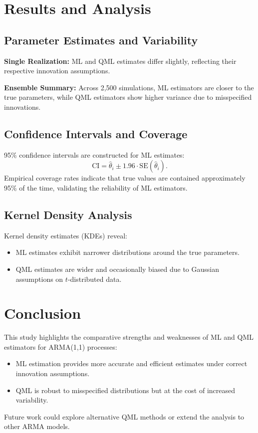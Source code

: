 \documentclass[a4paper,12pt]{article}
\begin{document}
\section{Results and Analysis}
\subsection{Parameter Estimates and Variability}
\textbf{Single Realization:} ML and QML estimates differ slightly, reflecting their respective innovation assumptions.

\textbf{Ensemble Summary:} Across 2,500 simulations, ML estimators are closer to the true parameters, while QML estimators show higher variance due to misspecified innovations.

\subsection{Confidence Intervals and Coverage}
95\% confidence intervals are constructed for ML estimates:
\[
\text{CI} = \hat{\theta}_i \pm 1.96 \cdot \text{SE}(\hat{\theta}_i).
\]
Empirical coverage rates indicate that true values are contained approximately 95\% of the time, validating the reliability of ML estimators.

\subsection{Kernel Density Analysis}
Kernel density estimates (KDEs) reveal:
\begin{itemize}
    \item ML estimates exhibit narrower distributions around the true parameters.
    \item QML estimates are wider and occasionally biased due to Gaussian assumptions on \(t\)-distributed data.
\end{itemize}

\section{Conclusion}
This study highlights the comparative strengths and weaknesses of ML and QML estimators for ARMA(1,1) processes:
\begin{itemize}
    \item ML estimation provides more accurate and efficient estimates under correct innovation assumptions.
    \item QML is robust to misspecified distributions but at the cost of increased variability.
\end{itemize}
Future work could explore alternative QML methods or extend the analysis to other ARMA models.
\end{document}
